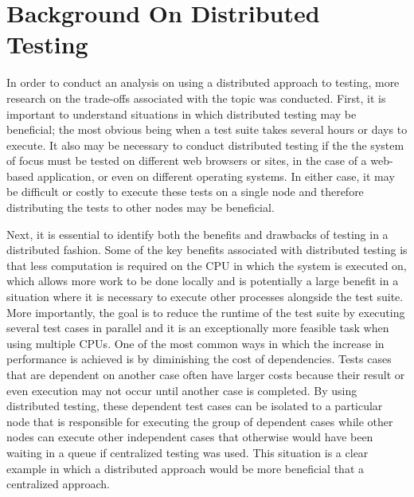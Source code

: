 \documentclass{article}
\begin{document}
{\section{Background On Distributed Testing}
\label{background}

In order to conduct an analysis on using a distributed approach to testing, more research on the trade-offs associated with the topic was conducted. First, it is important to understand situations in which distributed testing may be beneficial; the most obvious being when a test suite takes several hours or days to execute. It also may be necessary to conduct distributed testing if the the system of focus must be tested on different web browsers or sites, in the case of a web-based application, or even on different operating systems. In either case, it may be difficult or costly to execute these tests on a single node and therefore distributing the tests to other nodes may be beneficial. 

Next, it is essential to identify both the benefits and drawbacks of testing in a distributed fashion. Some of the key benefits associated with distributed testing is that less computation is required on the CPU in which the system is executed on, which allows more work to be done locally and is potentially a large benefit in a situation where it is necessary to execute other processes alongside the test suite. More importantly, the goal is to reduce the runtime of the test suite by executing several test cases in parallel and it is an exceptionally more feasible task when using multiple CPUs. One of the most common ways in which the increase in performance is achieved is by diminishing the cost of dependencies. Tests cases that are dependent on another case often have larger costs because their result or even execution may not occur until another case is completed. By using distributed testing, these dependent test cases can be isolated to a particular node that is responsible for executing the group of dependent cases while other nodes can execute other independent cases that otherwise would have been waiting in a queue if centralized testing was used. This situation is a clear example in which a distributed approach would be more beneficial that a centralized approach.

}
\end{document}
